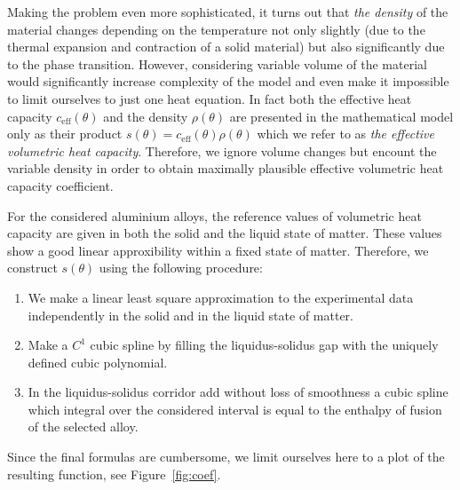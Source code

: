 Making the problem even more sophisticated, it turns out that \emph{the density} of the material changes depending on the temperature not only slightly (due to the thermal expansion and contraction of a solid material) but also significantly due to the phase transition. However, considering variable volume of the material would significantly increase complexity of the model and even make it impossible to limit ourselves to just one heat equation. In fact both the effective heat capacity $c_\text{eff}(\theta)$ and the density $\rho(\theta)$ are presented in the mathematical model only as their product $s(\theta) = c_\text{eff}(\theta) \rho(\theta)$ which we refer to as \emph{the effective volumetric heat capacity}. Therefore, we ignore volume changes but encount the variable density in order to obtain maximally plausible effective volumetric heat capacity coefficient.

For the considered aluminium alloys, the reference values of volumetric heat capacity are given in both the solid and the liquid state of matter. These values show a good linear approxibility within a fixed state of matter. Therefore, we construct $s(\theta)$ using the following procedure:
\begin{enumerate}
	\item We make a linear least square approximation to the experimental data independently in the solid and in the liquid state of matter.
	\item Make a $C^1$ cubic spline by filling the liquidus-solidus gap with the uniquely defined cubic polynomial.
	\item In the liquidus-solidus corridor add without loss of smoothness a cubic spline which integral over the considered interval is equal to the enthalpy of fusion of the selected alloy.
\end{enumerate}

Since the final formulas are cumbersome, we limit ourselves here to a plot of the resulting function, see Figure~\ref{fig:coef}.


